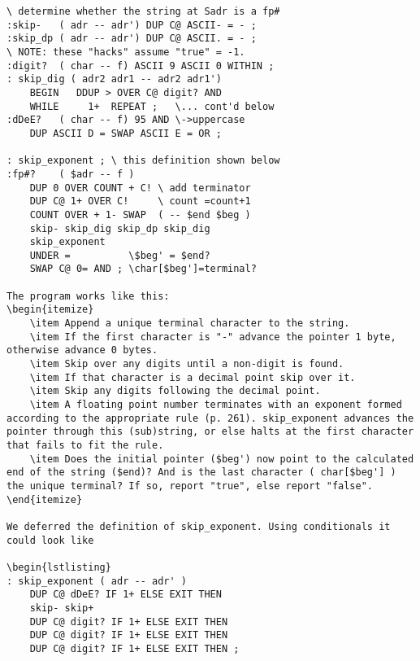 \documentclass{book}
\begin{document}
\begin{lstlisting}
\ determine whether the string at Sadr is a fp#
:skip-   ( adr -- adr') DUP C@ ASCII- = - ;
:skip_dp ( adr -- adr') DUP C@ ASCII. = - ;
\ NOTE: these "hacks" assume "true" = -1.
:digit?  ( char -- f) ASCII 9 ASCII 0 WITHIN ;
: skip_dig ( adr2 adr1 -- adr2 adr1')
    BEGIN   DDUP > OVER C@ digit? AND
    WHILE     1+  REPEAT ;   \... cont'd below
:dDeE?   ( char -- f) 95 AND \->uppercase
    DUP ASCII D = SWAP ASCII E = OR ;

: skip_exponent ; \ this definition shown below
:fp#?    ( $adr -- f )
    DUP 0 OVER COUNT + C! \ add terminator
    DUP C@ 1+ OVER C!     \ count =count+1
    COUNT OVER + 1- SWAP  ( -- $end $beg )
    skip- skip_dig skip_dp skip_dig
    skip_exponent
    UNDER =          \$beg' = $end?
    SWAP C@ 0= AND ; \char[$beg']=terminal?

The program works like this:
\begin{itemize}
    \item Append a unique terminal character to the string.
    \item If the first character is "-" advance the pointer 1 byte, otherwise advance 0 bytes.
    \item Skip over any digits until a non-digit is found.
    \item If that character is a decimal point skip over it.
    \item Skip any digits following the decimal point.
    \item A floating point number terminates with an exponent formed according to the appropriate rule (p. 261). skip_exponent advances the pointer through this (sub)string, or else halts at the first character that fails to fit the rule.
    \item Does the initial pointer ($beg') now point to the calculated end of the string ($end)? And is the last character ( char[$beg'] ) the unique terminal? If so, report "true", else report "false".
\end{itemize}

We deferred the definition of skip_exponent. Using conditionals it could look like

\begin{lstlisting}
: skip_exponent ( adr -- adr' )
    DUP C@ dDeE? IF 1+ ELSE EXIT THEN
    skip- skip+
    DUP C@ digit? IF 1+ ELSE EXIT THEN
    DUP C@ digit? IF 1+ ELSE EXIT THEN
    DUP C@ digit? IF 1+ ELSE EXIT THEN ;
\end{lstlisting}
\end{document}
